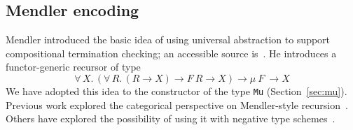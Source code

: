 \documentclass[a4paper,USenglish]{lipics-v2021}
\newcommand{\all}[2]{\forall\, #1.\, #2}
\begin{document}
\subsection{Mendler encoding}

Mendler introduced the basic idea of using universal abstraction to
support compositional termination checking; an accessible source
is~\cite{mendler91}.  He introduces a functor-generic recursor of type
\[
\all{X}{(\all{R}{(R \to X) \to F\ R \to X}) \to \mu\ F\ \to X}
\]
\noindent We have adopted this idea to the constructor of the type
\verb|Mu| (Section~\ref{sec:mu}).  Previous work explored the
categorical perspective on Mendler-style recursion~\cite{uustalu99}.
Others have explored the possibility of using it with negative type
schemes~\cite{ahn11}.


\end{document}
